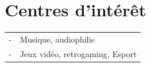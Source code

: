 \documentclass[9pt]{article}
\begin{document}
\vspace{-0.3cm}

\section{Centres d'int\'er\^et}
\begin{tabular}{rl}	
	-& Musique, audiophilie\\		
	-& Jeux vid\'eo, retrogaming, Esport		
\end{tabular}\\[10pt]
\end{document}
